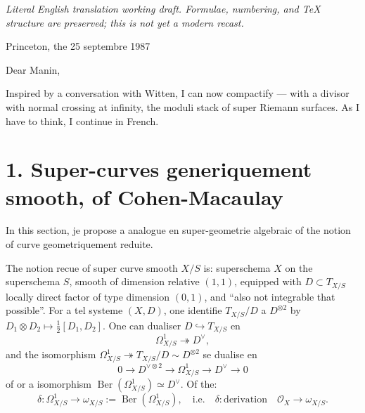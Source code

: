 \documentclass[11pt,a4paper]{article}
\theoremstyle{plain}
\theoremstyle{definition}
\DeclareMathOperator{\Ber}{Ber}
\begin{document}
\begin{center}\small\emph{Literal English translation working draft. Formulae, numbering, and TeX structure are preserved; this is not yet a modern recast.}\end{center}
\vspace{0.5em}


\begin{flushright}
Princeton, the 25 septembre 1987
\end{flushright}

\vspace{0.5cm}

\noindent Dear Manin,

\vspace{0.3cm}

Inspired by a conversation with Witten, I can now compactify --- with a divisor with normal crossing at infinity, the moduli stack of super Riemann surfaces. As I have to think, I continue in French.

\vspace{0.5cm}

\section*{1. Super-curves generiquement smooth, of Cohen-Macaulay}

In this section, je propose a analogue en super-geometrie algebraic of the notion of curve geometriquement reduite.

The notion recue of super curve smooth $X/S$ is: superschema $X$ on the superschema $S$, smooth of dimension relative $(1,1)$, equipped with $D \subset T_{X/S}$ locally direct factor of type dimension $(0,1)$, and ``also not integrable that possible''. For a tel systeme $(X,D)$, one identifie $T_{X/S}/D$ a $D^{\otimes 2}$ by $D_1 \otimes D_2 \mapsto \frac{1}{2}[D_1,D_2]$. One can dualiser $D \hookrightarrow T_{X/S}$ en
\[
\Omega^1_{X/S} \twoheadrightarrow D^{\vee},
\]
and the isomorphism $\Omega^1_{X/S} \twoheadrightarrow T_{X/S}/D \sim D^{\otimes 2}$ se dualise en
\[
0 \longrightarrow D^{\vee \otimes 2} \longrightarrow \Omega^1_{X/S} \longrightarrow D^{\vee} \longrightarrow 0
\]
of or a isomorphism $\Ber(\Omega^1_{X/S}) \simeq D^{\vee}$. Of the:
\begin{equation}\label{eq1.2}
\delta : \Omega^1_{X/S} \longrightarrow \omega_{X/S} := \Ber(\Omega^1_{X/S}), \quad \text{i.e.} \quad \delta : \text{derivation} \quad \mathcal{O}_X \longrightarrow \omega_{X/S}.
\end{equation}
\end{document}
